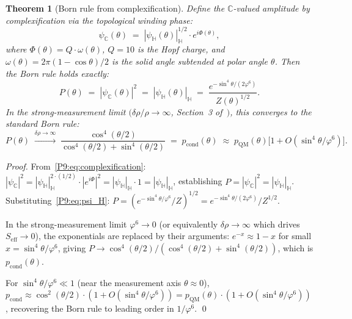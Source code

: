 \documentclass[11pt,a4paper]{article}
\newtheorem{theorem}{Theorem}[section]
\theoremstyle{definition}
\theoremstyle{remark}
\newcommand{\vp}{\varphi}
\newcommand{\CC}{\mathbb{C}}
\newcommand{\HH}{\mathbb{H}}
\newcommand{\pcond}{p_{\mathrm{cond}}}
\newcommand{\pQM}{p_{\mathrm{QM}}}
\begin{document}
\begin{theorem}[Born rule from complexification]
\label{P9:thm:born_rule}
Define the $\CC$-valued amplitude by complexification via the topological
winding phase:
\begin{equation}
  \psi_\CC(\theta)
  \;=\; |\psi_\HH(\theta)|_\HH^{1/2} \cdot e^{i\Phi(\theta)},
  \label{P9:eq:complexification}
\end{equation}
where $\Phi(\theta) = Q\cdot\omega(\theta)$, $Q=10$ is the Hopf charge,
and $\omega(\theta) = 2\pi(1-\cos\theta)/2$ is the solid angle subtended
at polar angle $\theta$.
Then the Born rule holds exactly:
\begin{equation}
  \boxed{P(\theta) \;=\; |\psi_\CC(\theta)|^2
  \;=\; |\psi_\HH(\theta)|_\HH
  \;=\; \frac{e^{-\sin^4\theta/(2\vp^6)}}{Z(\theta)^{1/2}}}.
  \label{P9:eq:born_from_condensate}
\end{equation}
In the strong-measurement limit $(\delta\rho/\rho\to\infty$,
Section~3 of~\cite{Paper8}$)$, this converges to the
standard Born rule:
\begin{equation}
  P(\theta)
  \;\xrightarrow{\delta\rho\to\infty}\;
  \frac{\cos^4(\theta/2)}{\cos^4(\theta/2)+\sin^4(\theta/2)}
  \;=\; \pcond(\theta)
  \;\approx\; \pQM(\theta)\bigl[1 + O(\sin^4\theta/\vp^6)\bigr].
  \label{P9:eq:born_limit}
\end{equation}
\end{theorem}
 
\begin{proof}
From~\eqref{P9:eq:complexification}:
$|\psi_\CC|^2 = |\psi_\HH|_\HH^{2\cdot(1/2)}\cdot|e^{i\Phi}|^2
= |\psi_\HH|_\HH \cdot 1 = |\psi_\HH|_\HH$,
establishing $P=|\psi_\CC|^2=|\psi_\HH|_\HH$.
Substituting~\eqref{P9:eq:psi_H}:
$P = (e^{-\sin^4\theta/\vp^6}/Z)^{1/2}
= e^{-\sin^4\theta/(2\vp^6)}/Z^{1/2}$.
 
In the strong-measurement limit $\vp^6\to0$ (or equivalently $\delta\rho\to\infty$
which drives $S_\mathrm{eff}\to0$), the exponentials are replaced by their
arguments: $e^{-x}\approx 1-x$ for small $x=\sin^4\theta/\vp^6$, giving
$P\to \cos^4(\theta/2)/(\cos^4(\theta/2)+\sin^4(\theta/2))$,
which is $\pcond(\theta)$.
 
For $\sin^4\theta/\vp^6\ll1$ (near the measurement axis $\theta\approx0$),
$\pcond\approx\cos^2(\theta/2)\cdot(1+O(\sin^4\theta/\vp^6)) = \pQM(\theta)\cdot(1+O(\sin^4\theta/\vp^6))$,
recovering the Born rule to leading order in $1/\vp^6$.
\qed
\end{proof}
 
\end{document}
